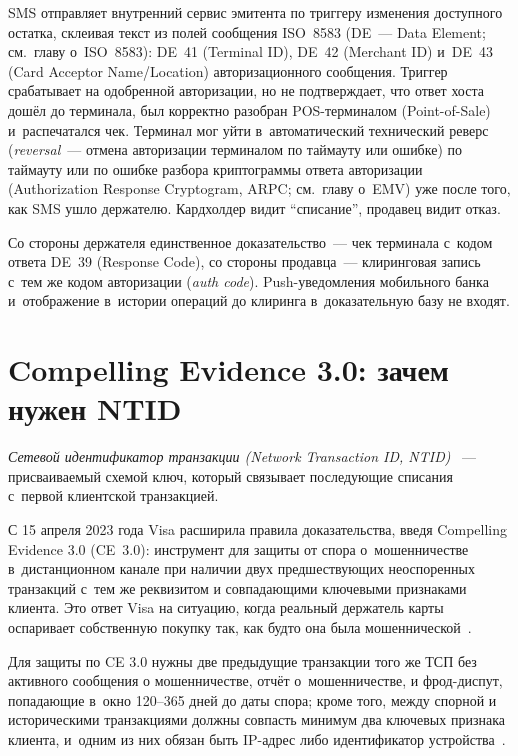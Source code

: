 SMS отправляет внутренний сервис эмитента по триггеру изменения
доступного остатка, склеивая текст из полей сообщения ISO~8583
(DE~--- Data Element; см.~главу о~ISO~8583): DE~41 (Terminal ID),
DE~42 (Merchant ID) и~DE~43 (Card Acceptor Name/Location)
авторизационного сообщения. Триггер срабатывает на одобренной
авторизации, но не подтверждает, что ответ хоста дошёл до
терминала, был корректно разобран POS-терминалом (Point-of-Sale)
и~распечатался чек. Терминал мог уйти в~автоматический технический
реверс (\textit{reversal}~--- отмена авторизации терминалом по таймауту или ошибке)
по таймауту или по ошибке разбора криптограммы ответа авторизации
(Authorization Response Cryptogram, ARPC; см.~главу о~EMV) уже после
того, как SMS ушло держателю. Кардхолдер видит \enquote{списание},
продавец видит отказ.

Со стороны держателя единственное доказательство~--- чек терминала
с~кодом ответа DE~39 (Response Code), со стороны продавца~--- клиринговая
запись с~тем же кодом авторизации (\textit{auth code}). Push-уведомления
мобильного банка и~отображение в~истории операций до клиринга
в~доказательную базу не входят.

\section{Compelling Evidence 3.0: зачем нужен NTID}\label{sec:disputes-ce30}

\emph{Сетевой идентификатор транзакции (Network Transaction ID, NTID)}
~--- присваиваемый схемой ключ, который связывает последующие списания
с~первой клиентской транзакцией.

С 15 апреля 2023 года Visa расширила правила доказательства, введя
Compelling Evidence 3.0 (CE~3.0): инструмент для защиты от
спора о~мошенничестве в~дистанционном канале при наличии двух
предшествующих неоспоренных транзакций с~тем же реквизитом и
совпадающими ключевыми признаками клиента. Это ответ Visa на
ситуацию, когда реальный держатель карты оспаривает
собственную покупку так, как будто она была мошеннической~\cite{visa-ce30-merchant-readiness,visa-core-rules}.

Для защиты по CE 3.0 нужны две
предыдущие транзакции того же ТСП без активного сообщения о
мошенничестве, отчёт о~мошенничестве, и фрод-диспут, попадающие в~окно
120--365 дней до даты спора; кроме
того, между спорной и историческими транзакциями должны совпасть
минимум два ключевых признака клиента, и~одним из них обязан быть
IP-адрес либо идентификатор устройства~\cite{visa-ce30-merchant-readiness}.


